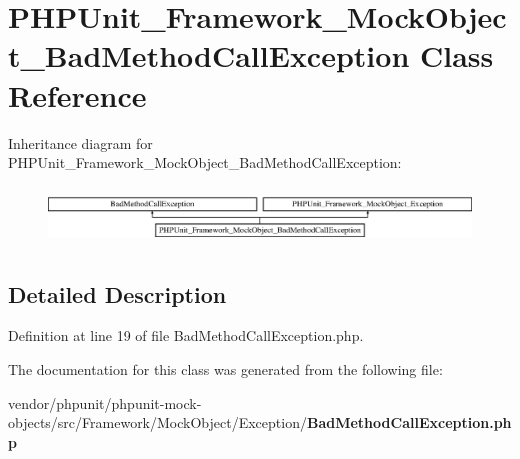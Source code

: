 \section{P\+H\+P\+Unit\+\_\+\+Framework\+\_\+\+Mock\+Object\+\_\+\+Bad\+Method\+Call\+Exception Class Reference}
\label{class_p_h_p_unit___framework___mock_object___bad_method_call_exception}
Inheritance diagram for P\+H\+P\+Unit\+\_\+\+Framework\+\_\+\+Mock\+Object\+\_\+\+Bad\+Method\+Call\+Exception\+:\begin{figure}[H]
\begin{center}
\leavevmode
\includegraphics[height=1.559888cm]{class_p_h_p_unit___framework___mock_object___bad_method_call_exception}
\end{center}
\end{figure}


\subsection{Detailed Description}


Definition at line 19 of file Bad\+Method\+Call\+Exception.\+php.



The documentation for this class was generated from the following file\+:\begin{DoxyCompactItemize}
\item 
vendor/phpunit/phpunit-\/mock-\/objects/src/\+Framework/\+Mock\+Object/\+Exception/{\bf Bad\+Method\+Call\+Exception.\+php}\end{DoxyCompactItemize}

